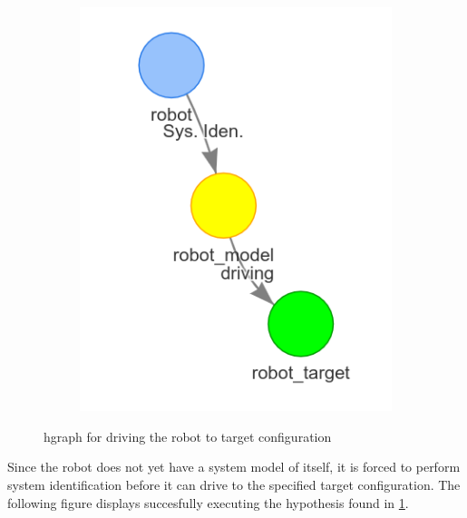 \begin{figure}[H]
\begin{subfigure}{.3\textwidth}
    \end{subfigure}
    \begin{subfigure}{.3\textwidth}
    \centering
    \includegraphics[width=\textwidth]{figures/connecting_nodes/robot_to_target/robot_iden_drive_target}
    \end{subfigure}
    \hfill
    \caption{\ac{hgraph} for driving the robot to target configuration}%
    \label{fig:robot_drive_hgraph}
\end{figure}

Since the robot does not yet have a system model of itself, it is forced to perform system identification before it can drive to the specified target configuration. The following figure displays succesfully executing the hypothesis found in \cref{fig:robot_drive_hgraph}.\bs

